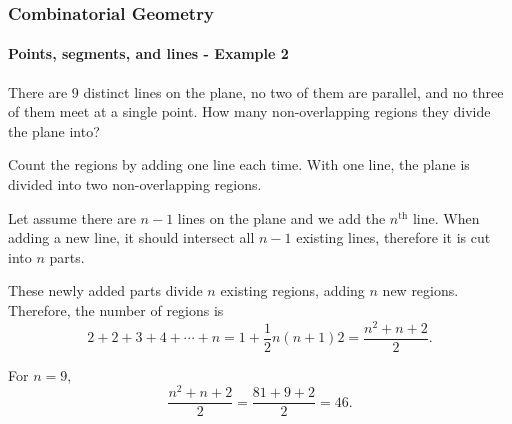 \documentclass[8pt,xcolor=table,dvipsnames]{beamer}
\begin{document}
\begin{frame}[t]
    \frametitle{Combinatorial Geometry}
    \framesubtitle{Points, segments, and lines - Example 2}
    \begin{example}
        There are $9$ distinct lines on the plane, no two of them are parallel, and no three of them meet at a single point.
        How many non-overlapping regions they divide the plane into?
    \end{example}
    
    \bigbreak
    Count the regions by adding one line each time.
    With one line, the plane is divided into two non-overlapping regions.

    \bigbreak
    Let assume there are $n-1$ lines on the plane and we add the $n^{\text{th}}$ line.
    When adding a new line, it should intersect all $n-1$  existing lines, therefore it is cut into $n$ parts.

    \bigbreak
    These newly added parts divide $n$ existing regions, adding $n$ new regions.
    Therefore, the number of regions is \[ 2+2+3+4+\cdots+n=1+\frac{1}{2}{n(n+1){2}} = \frac{n^2+n+2}{2}. \]

    For $n=9,$ \[ \frac{n^2+n+2}{2} = \frac{81+9+2}{2} = \boxed{46.} \]
\end{frame}
\end{document}
